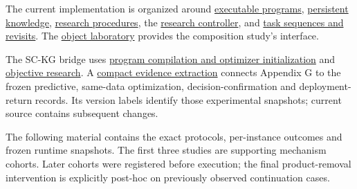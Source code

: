 \documentclass[11pt,a4paper]{article}
\begin{document}
The current implementation is organized around \hyperlink{artifact-1}{executable programs}, \hyperlink{artifact-2}{persistent knowledge}, \hyperlink{artifact-3}{research procedures}, the \hyperlink{artifact-4}{research controller}, and \hyperlink{artifact-5}{task sequences and revisits}. The \hyperlink{artifact-6}{object laboratory} provides the composition study's interface.


The SC-KG bridge uses \hyperlink{artifact-7}{program compilation and optimizer initialization}
and \hyperlink{artifact-8}{objective research}.
A \hyperlink{artifact-9}{compact evidence extraction}
connects Appendix G to the frozen predictive, same-data optimization,
decision-confirmation and deployment-return records. Its version labels identify those experimental
snapshots; current source contains subsequent changes.


The following material contains the exact protocols, per-instance outcomes and
frozen runtime snapshots. The first three studies are supporting mechanism
cohorts. Later cohorts were registered before execution; the final product-removal
intervention is explicitly post-hoc on previously observed continuation cases.
\end{document}
